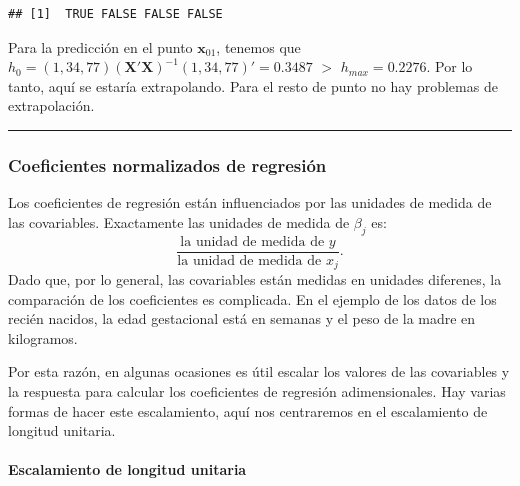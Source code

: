 \documentclass[
]{article}
\begin{document}
\begin{verbatim}
## [1]  TRUE FALSE FALSE FALSE
\end{verbatim}

Para la predicción en el punto \(\boldsymbol x_{01}\), tenemos que \(h_{0} = (1, 34, 77)(\boldsymbol X'\boldsymbol X)^{-1}(1, 34, 77)' = 0.3487\) \(>\) \(h_{max} = 0.2276\). Por lo tanto, aquí se estaría extrapolando. Para el resto de punto no hay problemas de extrapolación.

\rule{\textwidth}{0.4pt}

\hypertarget{coeficientes-normalizados-de-regresiuxf3n}{%
\subsubsection{Coeficientes normalizados de regresión}\label{coeficientes-normalizados-de-regresiuxf3n}}

Los coeficientes de regresión están influenciados por las unidades de medida de las covariables. Exactamente las unidades de medida de \(\beta_{j}\) es:
\[
\frac{\mbox{la unidad de medida de }y }{\mbox{la unidad de medida de }x_{j}}.
\]
Dado que, por lo general, las covariables están medidas en unidades diferenes, la comparación de los coeficientes es complicada. En el ejemplo de los datos de los recién nacidos, la edad gestacional está en semanas y el peso de la madre en kilogramos.

Por esta razón, en algunas ocasiones es útil escalar los valores de las covariables y la respuesta para calcular los coeficientes de regresión adimensionales. Hay varias formas de hacer este escalamiento, aquí nos centraremos en el escalamiento de longitud unitaria.

\hypertarget{escalamiento-de-longitud-unitaria}{%
\paragraph{Escalamiento de longitud unitaria}\label{escalamiento-de-longitud-unitaria}}
\end{document}
